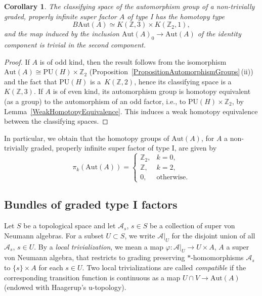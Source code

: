 \documentclass[10pt,a4paper]{amsart}
\numberwithin{equation}{section}
\newtheorem{Corollary}[Theorem]{Corollary}
\newcommand{\Z}{\mathbb{Z}}
\newcommand{\A}{\mathcal{A}}
\newcommand{\Aut}{\mathrm{Aut}}
\begin{document}
\begin{Corollary} \label{CorollaryHomotopyType}
The classifying space of the automorphism group of a non-trivially graded, properly infinite super factor $A$ of type I has the homotopy type
\begin{equation*}
B\Aut(A) \simeq K(\Z, 3) \times K(\Z_2, 1),
\end{equation*}
and the map induced by the inclusion $\Aut(A)_0 \to \Aut(A)$ of the identity component is trivial in the second component.
\end{Corollary}

\begin{proof}
If $A$ is of odd kind, then the result follows from the isomorphism ${\Aut(A) \cong \mathrm{PU}(H)\times \Z_2}$ (Proposition~\ref{PropositionAutomorphismGroups}\,(ii)) and the fact that $\mathrm{PU}(H)$ is a~$K(\Z, 2)$, hence its classifying space is a~$K(\Z, 3)$.
If $A$ is of even kind, its automorphism group is homotopy equivalent (as a group) to the automorphism of an odd factor, i.e., to $\mathrm{PU}(H) \times \Z_2$, by Lemma~\ref{WeakHomotopyEquivalence}.
This induces a weak homotopy equivalence between the classifying spaces.
\end{proof}

In particular, we obtain that the homotopy groups of $\Aut(A)$, for $A$ a non-trivially graded, properly infinite super factor of type I, are given by
\begin{equation} \label{HomotopyGroupsAutA}
 \pi_k(\Aut(A)) = \begin{cases} \Z_2, & k=0, \\ \Z, & k=2, \\ 0, & \text{otherwise}. \end{cases}
\end{equation}

\subsection{Bundles of graded type I factors} \label{SectionBundles}

Let $S$ be a topological space and let $\A_s$, $s \in S$ be a collection of super von Neumann algebras.
For a subset $U \subset S$, we write $\A|_U$ for the disjoint union of all $\A_s$, $s \in U$.
By a \emph{local trivialization}, we mean a map $\varphi\colon \A|_U \to U \times A$, $A$ a super von Neumann algebra, that restricts to grading preserving $*$-homomorphisms $\A_s$ to $\{s\} \times A$ for each $s \in U$.
Two local trivializations are called \emph{compatible} if the corresponding transition function is continuous as a map $U \cap V \to \Aut(A)$ (endowed with Haagerup's u-topology).
\end{document}
